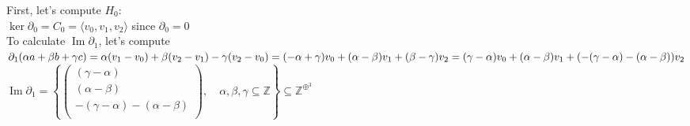 \documentclass[11pt,a4paper]{report}
\DeclareMathOperator{\Ima}{Im}
\begin{document}
\par
First, let's compute $H_0$: \\
$\ker\partial_0 = C_0 = \langle v_0, v_1, v_2 \rangle$ since $\partial_0 = 0$ \\ 
To calculate $\Ima\partial_1$, let's compute $\partial_1(\alpha a + \beta b + \gamma c) = \alpha (v_1-v_0) + \beta (v_2-v_1) - \gamma (v_2-v_0) \\ = (-\alpha + \gamma)v_0 + (\alpha - \beta)v_1 + (\beta - \gamma)v_2 = (\gamma -\alpha)v_0 + (\alpha - \beta)v_1 + (-(\gamma - \alpha)-(\alpha - \beta))v_2 $ \\
$\Ima\partial_1 = \left\{ \left(\begin{array}{c}
          		                 	( \gamma - \alpha )\\
          		                 	(\alpha - \beta)\\
          		                 	-(\gamma - \alpha)-(\alpha - \beta)\\
          		                 \end{array} \right), \quad \alpha, \beta, \gamma \subseteq \mathbb{Z} \right\} \subseteq \mathbb{Z}^{\oplus^3} $ \\
          		                 
\end{document}
